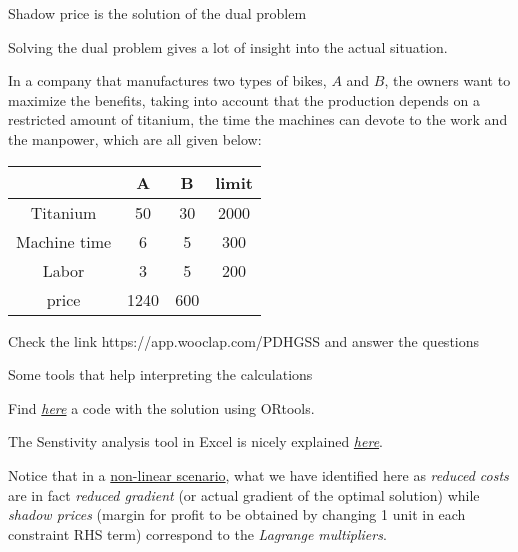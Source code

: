 \documentclass[c]{beamer}
\begin{document}

\begin{frame}{Shadow price is the solution of the dual problem}

  Solving the dual problem gives a lot of insight into the actual situation.

  \begin{Exercise}
  In a company that manufactures two types of bikes, $A$ and $B$, the owners want to maximize the benefits, taking into account that the production depends on a restricted amount of titanium, the time the machines can devote to the work and the manpower, which are all given below:
  \begin{center}
  \begin{tabular}{c|c|c|c}
   & A & B & limit\\
   \hline
   Titanium & 50 & 30 & 2000\\
    Machine time & 6 & 5 & 300\\
    Labor & 3 & 5 &200\\
   \hline
   price & 1240 & 600 & \\
  \end{tabular}
  \end{center}

  Check the link https://app.wooclap.com/PDHGSS and answer the questions


  \end{Exercise}

\end{frame}

\begin{frame}{Some tools that help interpreting the calculations}

  Find \href{https://github.com/JordiVillaFreixa/ORcode/blob/main/linear_programming.py}{\em here} a code with the solution using ORtools.

  The Senstivity analysis tool in Excel is nicely explained \href{https://www.youtube.com/watch?v=zKqU5NGE-t0&list=PLjiMsqjDUvBiArYMqCGZSDJNgEMPALdQu&index=1}{\em here}.

  Notice that in a \href{https://youtu.be/v2ZuKwAaXOI}{non-linear scenario}, what we have identified here as {\em reduced costs} are in fact {\em reduced gradient} (or actual gradient of the optimal solution) while {\em shadow prices} (margin for profit to be obtained by changing 1 unit in each constraint RHS term) correspond to the {\em Lagrange multipliers}.

\end{frame}



\end{document}
